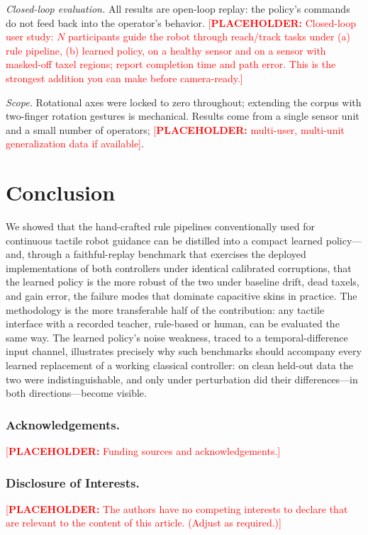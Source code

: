 \documentclass[runningheads]{llncs}
\newcommand{\placeholder}[1]{\textcolor{red}{[\textbf{PLACEHOLDER:} #1]}}
\begin{document}
\emph{Closed-loop evaluation.}
All results are open-loop replay: the policy's commands do not feed back
into the operator's behavior.
\placeholder{Closed-loop user study: $N$ participants guide the robot
through reach/track tasks under (a) rule pipeline, (b) learned policy,
on a healthy sensor and on a sensor with masked-off taxel regions;
report completion time and path error. This is the strongest addition
you can make before camera-ready.}

\emph{Scope.}
Rotational axes were locked to zero throughout; extending the corpus with
two-finger rotation gestures is mechanical.  Results come from a single
sensor unit and a small number of operators;
\placeholder{multi-user, multi-unit generalization data if available}.

\section{Conclusion}
\label{sec:conclusion}

We showed that the hand-crafted rule pipelines conventionally used for
continuous tactile robot guidance can be distilled into a compact learned
policy---and, through a faithful-replay benchmark that exercises the
deployed implementations of both controllers under identical calibrated
corruptions, that the learned policy is the more robust of the two under
baseline drift, dead taxels, and gain error, the failure modes that
dominate capacitive skins in practice.  The methodology is the more
transferable half of the contribution: any tactile interface with a
recorded teacher, rule-based or human, can be evaluated the same way.
The learned policy's noise weakness, traced to a temporal-difference input
channel, illustrates precisely why such benchmarks should accompany every
learned replacement of a working classical controller: on clean held-out
data the two were indistinguishable, and only under perturbation did their
differences---in both directions---become visible.

\subsubsection{Acknowledgements.}
\placeholder{Funding sources and acknowledgements.}

\subsubsection{Disclosure of Interests.}
\placeholder{The authors have no competing interests to declare that are
relevant to the content of this article. (Adjust as required.)}



\end{document}
